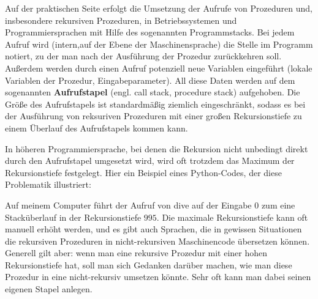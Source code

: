 \begin{bem}
	Auf der praktischen Seite erfolgt die Umsetzung der Aufrufe von Prozeduren und, insbesondere rekursiven Prozeduren, in Betriebssystemen und Programmiersprachen mit Hilfe des sogenannten Programmstacks. Bei jedem Aufruf wird (intern,auf der Ebene der Maschinensprache) die Stelle im Programm notiert, zu der man nach der Ausführung  der Prozedur zurückkehren soll. Außerdem werden durch einen Aufruf potenziell neue Variablen eingeführt (lokale Variablen der Prozedur, Eingabeparameter). All diese Daten werden auf dem sogenannten \textbf{Aufrufstapel} (engl. call stack, procedure stack) aufgehoben. Die Größe des Aufrufstapels ist standardmäßig ziemlich eingeschränkt, sodass es bei der Ausführung von reksuriven Prozeduren mit einer großen Rekursionstiefe zu einem Überlauf des Aufrufstapels kommen kann. 
	
	In höheren Programmiersprache, bei denen die Rekursion nicht unbedingt direkt durch den Aufrufstapel umgesetzt wird, wird oft trotzdem das Maximum der Rekursionstiefe festgelegt. 	Hier ein Beispiel eines Python-Codes, der diese Problematik illustriert: 
	
	
	Auf meinem Computer führt der Aufruf von dive auf der Eingabe $0$ zum eine Stacküberlauf  in der Rekursionstiefe $995$. Die maximale Rekursionstiefe kann oft manuell erhöht werden, und es gibt auch Sprachen, die in gewissen Situationen die rekursiven Prozeduren in nicht-rekursiven Maschinencode übersetzen können. Generell gilt aber: wenn man eine rekursive Prozedur mit einer hohen Rekursionstiefe hat, soll man sich Gedanken darüber machen, wie man diese Prozedur in eine nicht-rekursiv umsetzen könnte. Sehr oft kann man dabei seinen eigenen Stapel anlegen. 
\end{bem} 

